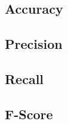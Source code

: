 \subsection{Accuracy}

\subsection{Precision}

\subsection{Recall}

\subsection{F-Score}















